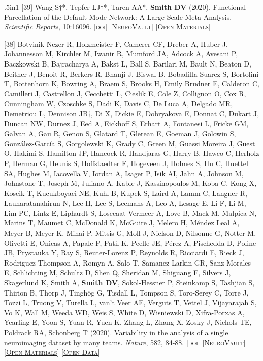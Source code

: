 \documentclass[11pt, letterpaper]{article}
\newcommand{\doi}[1]{\href{#1}{\scriptsize\textsc{[doi]}}} %
\newcommand{\neurovault}[1]{\href{#1}{\scriptsize\textsc{[NeuroVault]}}}
\newcommand{\materials}[1]{\href{#1}{\scriptsize\textsc{[Open Materials]}}}
\newcommand{\data}[1]{\href{#1}{\scriptsize\textsc{[Open Data]}}}
\begin{document}
\begin{hangparas}{.5in}{1}
[39] Wang S†*, Tepfer LJ†*, Taren AA*, \textbf{Smith DV} (2020). Functional Parcellation of the Default Mode Network: A Large-Scale Meta-Analysis. \textit{Scientific Reports}, 10:16096. \doi{https://doi.org/10.1038/s41598-020-72317-8} \neurovault{https://identifiers.org/neurovault.collection:6262} \materials{https://zenodo.org/record/3599989\#.Xl2u4y2ZPOQ} 

[38] Botvinik-Nezer R, Holzmeister F, Camerer CF, Dreber A, Huber J, Johannesson M, Kirchler M, Iwanir R, Mumford JA, Adcock A, Avesani P, Baczkowski B, Bajracharya A, Bakst L, Ball S, Barilari M, Bault N, Beaton D, Beitner J, Benoit R, Berkers R, Bhanji J, Biswal B, Bobadilla-Suarez S, Bortolini T, Bottenhorn K, Bowring A, Braem S, Brooks H, Emily Brudner E, Calderon C, Camilleri J, Castrellon J, Cecchetti L, Cieslik E, Cole Z, Collignon O, Cox R, Cunningham W, Czoschke S, Dadi K, Davis C, De Luca A, Delgado MR, Demetriou L, Dennison JB†, Di X, Dickie E, Dobryakova E, Donnat C, Dukart J, Duncan NW, Durnez J, Eed A, Eickhoff S, Erhart A, Fontanesi L, Fricke GM, Galvan A, Gau R, Genon S, Glatard T, Glerean E, Goeman J,  Golowin S, González-García S, Gorgolewski K, Grady C, Green M, Guassi Moreira J, Guest O, Hakimi S, Hamilton JP, Hancock R, Handjaras G, Harry B, Hawco C, Herholz P, Herman G, Heunis S, Hoffstaedter F, Hogeveen J, Holmes S, Hu C, Huettel SA, Hughes M, Iacovella V, Iordan A, Isager P, Isik AI, Jahn A, Johnson M, Johnstone T, Joseph M, Juliano A, Kable J, Kassinopoulos M, Koba C, Kong X, Koscik T, Kucukboyaci NE, Kuhl B, Kupek S, Laird A, Lamm C, Langner R, Lauharatanahirun N, Lee H, Lee S, Leemans A, Leo A, Lesage E, Li F, Li M, Lim PC, Lintz E, Liphardt S, Losecaat Vermeer A, Love B, Mack M, Malpica N, Marins T, Maumet C, McDonald K, McGuire J, Melero H, Méndez Leal A, Meyer B, Meyer K, Mihai P, Mitsis G, Moll J, Nielson D, Nilsonne G, Notter M, Olivetti E, Onicas A, Papale P, Patil K, Peelle JE, Pérez A, Pischedda D, Poline JB, Prystauka Y, Ray S, Reuter-Lorenz P, Reynolds R, Ricciardi E, Rieck J, Rodriguez-Thompson A, Romyn A, Salo T, Samanez-Larkin GR, Sanz-Morales E, Schlichting M, Schultz D, Shen Q, Sheridan M, Shiguang F, Silvers J, Skagerlund K, Smith A, \textbf{Smith DV}, Sokol-Hessner P, Steinkamp S, Tashjian S, Thirion B, Thorp J, Tinghög G, Tisdall L, Tompson S, Toro-Serey C, Torre J, Tozzi L, Truong V, Turella L, van’t Veer AE, Verguts T, Vettel J, Vijayarajah S, Vo K, Wall M, Weeda WD, Weis S, White D, Wisniewski D, Xifra-Porxas A, Yearling E, Yoon S, Yuan R, Yuen K, Zhang L, Zhang X, Zosky J, Nichols TE, Poldrack RA, Schonberg T (2020). Variability in the analysis of a single neuroimaging dataset by many teams. \textit{Nature}, 582, 84-88. \doi{https://doi.org/10.1038/s41586-020-2314-9} \neurovault{https://neurovault.org/collections/6047/} \materials{https://github.com/poldrack/narps} \data{https://openneuro.org/datasets/ds001734/versions/1.0.4} 


\end{hangparas}
\end{document}
